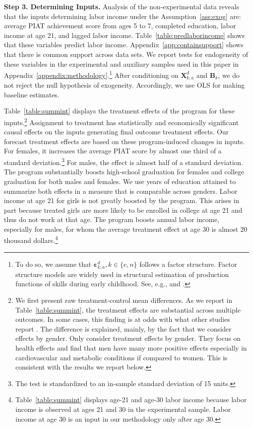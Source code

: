 \textbf{Step 3. Determining Inputs.} Analysis of the non-experimental data reveals that the inputs determining labor income under the Assumption~\ref{ass:exog} are: average PIAT achievement score from ages 5 to 7, completed education, labor income at age 21, and lagged labor income. Table~\ref{table:predlaborincome} shows that these variables predict labor income. Appendix~\ref{app:containsupport} shows that there is common support across data sets. We report tests for endogeneity of these variables in the experimental and auxiliary samples used in this paper in Appendix~\ref{appendix:methodology}.\footnote{To do so, we assume that $\bm{\varepsilon}_{k,a}^d, k \in \{e,n\}$ follows a factor structure. Factor structure models are widely used in structural estimation of production functions of skills during early childhood. See, e.g., \citet{Cunha_Heckman_2008_JHR} and \citet{Cunha_Heckman_etal_2010_est_tech_cognoncog}.} After conditioning on $\bm{X}_{k,a}^d$ and $\bm{B}_{k}$, we do not reject the null hypothesis of exogeneity. Accordingly, we use OLS for making baseline estimates.

Table~\ref{table:summint} displays the treatment effects of the program for these inputs.\footnote{We first present raw treatment-control mean differences. As we report in Table~\ref{table:summint}, the treatment effects are substantial across multiple outcomes. In some cases, this finding is at odds with what other studies report \citep{Ramey_etal_1985_Project-CARE_TiECSE,Clarke_Campbell_1998_ABC_Comparison_ECRQ,Campbell_Pungello_etal_2001_DP,Campbell_Ramey_etal_2002_ADS,Campbell_Wasik_etal_2008_ECRQ,Campbell_Conti_etal_2014_EarlyChildhoodInvestments}. The difference is explained, mainly, by the fact that we consider effects by gender.  Only \citet{Campbell_Conti_etal_2014_EarlyChildhoodInvestments} consider treatment effects by gender. They focus on health effects and find that men have many more positive effects especially in cardiovascular and metabolic conditions if compared to women. This is consistent with the results we report below.} Assignment to treatment has statistically and economically significant causal effects on the inputs generating final outcome treatment effects. Our forecast treatment effects are based on these program-induced changes in inputs. For females, it increases the average PIAT score by almost one third of a standard deviation.\footnote{The test is standardized to an in-sample standard deviation of 15 units.} For males, the effect is almost half of a standard deviation. The program substantially boosts high-school graduation for females and college graduation for both males and females. We use years of education attained to summarize both effects in a measure that is comparable across genders. Labor income at age 21 for girls is not greatly boosted by the program. This arises in part because treated girls are more likely to be enrolled in college at age 21 and thus do not work at that age. The program boosts annual labor income, especially for males, for whom the average treatment effect at age 30 is almost 20 thousand dollars.\footnote{Table~\ref{table:summint} displays age-21 and age-30 labor income because labor income is observed at ages 21 and 30 in the experimental sample. Labor income at age 30 is an input in our methodology only after age 30.}

